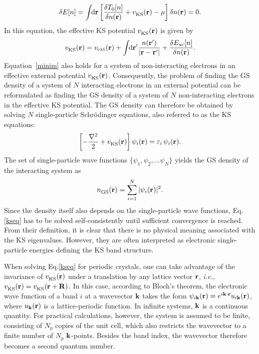 %
\begin{align}\label{minim}
    \delta E[n] = \int\text{\!\!d}\mathbf{r}\left[ \frac{\delta T_0[n]}{\delta n(\mathbf{r})} + v_\text{KS}^{\phantom{I}}(\mathbf{r}) - \mu \right] \delta n(\mathbf{r}) = 0.
\end{align}
%
In this equation, the effective KS potential $v_\text{KS}^{\phantom{I}}(\mathbf{r})$ is given by 
%
\begin{align}
   v_\text{KS}^{\phantom{I}}(\mathbf{r}) =  v_\text{ext}(\mathbf{r})+\int\text{\!\!d}\mathbf{r}'\frac{n(\mathbf{r}')}{|\mathbf{r-r'}|} + \frac{\delta E_\text{xc}[n]}{\delta n(\mathbf{r})}.
\end{align}
%
Equation~\eqref{minim} also holds for a system of non-interacting electrons in an effective external potential $v_\text{KS}^{\phantom{I}}(\mathbf{r})$. Consequently, the problem of finding the GS density of a system of $N$ interacting electrons in an external potential can be reformulated as finding the GS density of a system of $N$ non-interacting electrons in the effective KS potential.
The GS density can therefore be obtained  by solving $N$ single-particle Schr\"odinger equations, also referred to as the KS equations:
%
\begin{align}\label{kseq}
\left[ -\frac{\nabla^2}{2} + v_\text{KS}^{\phantom{I}}(\mathbf{r}) \right] \psi_i(\mathbf{r}) = \varepsilon_i\,\psi_i(\mathbf{r}).
\end{align}
%
The set of single-particle wave functions $\{\psi_1,\psi_2,...\psi_N\}$ yields the GS density of the interacting system as
%
\begin{align}
    n_\text{GS}^{\phantom{I}}(\mathbf{r}) = \sum^N_{i=1}|\psi_i(\mathbf{r})|^2.
\end{align}
%
Since the density itself also depends on the single-particle wave functions, Eq.\;\eqref{kseq} has to be solved self-consistently until sufficient convergence is reached. From their definition, it is clear that there is no physical meaning associated with the KS eigenvalues. However, they are often interpreted as electronic single-particle energies\cite{gw_method} defining the KS band structure.\par
%
When solving Eq.\;\eqref{kseq} for periodic crystals, one can take advantage of the invariance of $v_\text{KS}^{\phantom{I}}(\mathbf{r})$ under a translation by any lattice vector  $\mathbf{r}$, \textit{i.e.}, $v_\text{KS}^{\phantom{I}}(\mathbf{r})=v_\text{KS}^{\phantom{I}}(\mathbf{r+R})$. In this case, according to Bloch's theorem, the electronic wave function of a band $i$ at a wavevector $\mathbf{k}$ takes the form $\psi_{i\mathbf{k}}(\mathbf{r})=e^{i\mathbf{k\cdot r}}u_{i\mathbf{k}}(\mathbf{r})$, where $u_{\mathbf{k}}(\mathbf{r})$ is a lattice-periodic function. In infinite systems, $\mathbf{k}$ is a continuous quantity. For practical calculations, however, the system is assumed to be finite, consisting of $N_p$ copies of the unit cell, which also restricts the wavevector to a finite number of $N_p$ $\mathbf{k}$-points. Besides the band index, the wavevector therefore becomes a second quantum number.\par

